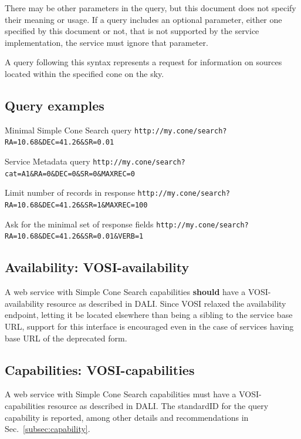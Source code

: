 \documentclass[11pt,a4paper]{ivoa}
\begin{document}
There may be other parameters in the query, but this document does not specify their meaning or usage. If a query includes an optional parameter, either one specified by this document or not, that is not supported by the service implementation, the service must ignore that parameter.

A query following this syntax represents a request for information on sources located within the specified cone on the sky.

\subsection{Query examples}
\begin{bigdescription}
\item[Minimal Simple Cone Search query] \nolinkurl{http://my.cone/search?RA=10.68\&DEC=41.26\&SR=0.01}
\item[Service Metadata query] \nolinkurl{http://my.cone/search?cat=A1\&RA=0\&DEC=0\&SR=0\&MAXREC=0}
\item[Limit number of records in response] \nolinkurl{http://my.cone/search?RA=10.68\&DEC=41.26\&SR=1\&MAXREC=100}
\item[Ask for the minimal set of response fields] \nolinkurl{http://my.cone/search?RA=10.68\&DEC=41.26\&SR=0.01\&VERB=1}
\end{bigdescription}

\subsection{Availability: VOSI-availability}
A web service with Simple Cone Search capabilities \textbf{should} have a VOSI-availability resource as described in DALI. Since VOSI relaxed the availability endpoint, letting it be located elsewhere than being a sibling to the service base URL, support for this interface is encouraged even in the case of services having base URL of the deprecated form.

\subsection{Capabilities: VOSI-capabilities}
A web service with Simple Cone Search capabilities must have a VOSI-capabilities resource as described in DALI. The standardID for the {query} capability is reported, among other details and recommendations in Sec.~\ref{subsec:capability}.
\end{document}
